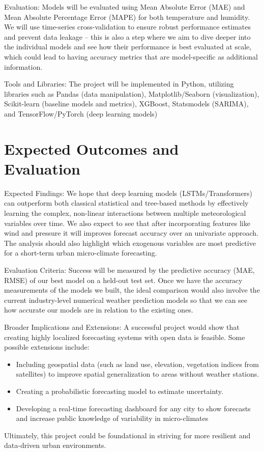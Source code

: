 \documentclass{article}
\begin{document}
Evaluation: Models will be evaluated using Mean Absolute Error (MAE) and Mean Absolute Percentage Error (MAPE) for both temperature and humidity. We will use time-series cross-validation to ensure robust performance estimates and prevent data leakage -- this is also a step where we aim to dive deeper into the individual models and see how their performance is best evaluated at scale, which could lead to having accuracy metrics that are model-specific as additional information.

Tools and Libraries: The project will be implemented in Python, utilizing libraries such as Pandas (data manipulation), Matplotlib/Seaborn (visualization), Scikit-learn (baseline models and metrics), XGBoost, Statsmodels (SARIMA), and TensorFlow/PyTorch (deep learning models)

\section{Expected Outcomes and Evaluation}

Expected Findings: We hope that deep learning models (LSTMs/Transformers) can outperform both classical statistical and tree-based methods by effectively learning the complex, non-linear interactions between multiple meteorological variables over time. We also expect to see that after incorporating features like wind and pressure it will improves forecast accuracy over an univariate approach. The analysis should also highlight which exogenous variables are most predictive for a short-term urban micro-climate forecasting.

Evaluation Criteria: Success will be measured by the predictive accuracy (MAE, RMSE) of our best model on a held-out test set. Once we have the accuracy measurements of the models we built, the ideal comparison would also involve the current industry-level numerical weather prediction models so that we can see how accurate our models are in relation to the existing ones.

Broader Implications and Extensions: A successful project would show that creating highly localized forecasting systems with open data is feasible. Some possible extensions include:
\begin{itemize}
    \item Including geospatial data (such as land use, elevation, vegetation indices from satellites) to improve spatial generalization to areas without weather stations.
    \item Creating a probabilistic forecasting model to estimate uncertainty.
    \item Developing a real-time forecasting dashboard for any city to show forecasts and increase public knowledge of variability in micro-climates
\end{itemize}
Ultimately, this project could be foundational in striving for more resilient and data-driven urban environments.
\end{document}
